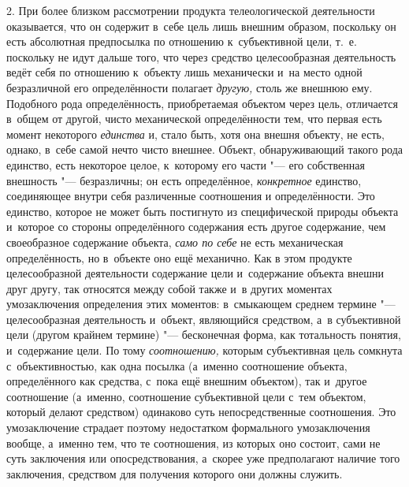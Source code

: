 2. При более близком рассмотрении продукта телеологической
деятельности оказывается, что он содержит в~себе цель лишь внешним образом,
поскольку он есть абсолютная предпосылка по отношению к~субъективной цели,
т.~е. поскольку не идут дальше того, что через средство целесообразная
деятельность ведёт себя по отношению к~объекту лишь механически и~на место
одной безразличной его определённости полагает {\em другую,} столь же
внешнюю ему. Подобного рода определённость, приобретаемая объектом через
цель, отличается в~общем от другой, чисто механической
определённости тем, что первая есть момент некоторого
{\em единства} и, стало
быть, хотя она внешня объекту, не есть, однако, в~себе самой нечто чисто
внешнее. Объект, обнаруживающий такого рода единство, есть некоторое целое,
к~которому его части "--- его собственная внешность
"--- безразличны; он есть определённое,
{\em конкретное}
единство, соединяющее внутри себя различенные соотношения и
определённости. Это единство, которое не может быть постигнуто из
специфической природы объекта и~которое со стороны определённого содержания
есть другое содержание, чем своеобразное содержание объекта,
{\em само по себе} не
есть механическая определённость, но в~объекте оно ещё механично. Как в
этом продукте целесообразной деятельности содержание цели и~содержание
объекта внешни друг другу, так относятся между собой также и~в других
моментах умозаключения определения этих моментов: в~смыкающем среднем
термине "--- целесообразная деятельность и~объект, являющийся
средством, а~в субъективной цели (другом крайнем термине)
"--- бесконечная форма, как тотальность понятия, и~содержание
цели. По тому {\em соотношению,}
которым субъективная цель сомкнута с~объективностью, как одна
посылка (а~именно соотношение объекта, определённого как средства, с~пока
ещё внешним объектом), так и~другое соотношение (а~именно, соотношение
субъективной цели с~тем объектом, который делают средством) одинаково суть
непосредственные соотношения. Это умозаключение страдает поэтому
недостатком формального умозаключения вообще, а~именно тем, что те
соотношения, из которых оно состоит, сами не суть заключения или
опосредствования, а~скорее уже предполагают наличие того заключения,
средством для получения которого они должны служить.

